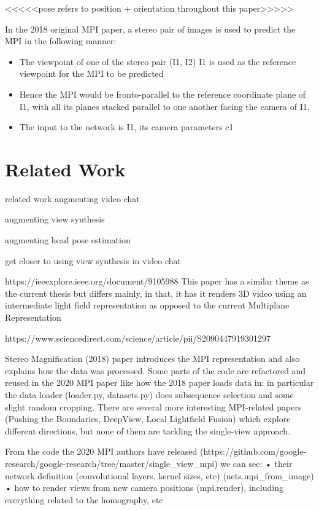 <<<<<pose refers to position + orientation throughout this paper>>>>>

In the 2018 original MPI paper, a stereo pair of images is used to predict the MPI in the following manner:

\begin{itemize}
    \item The viewpoint of one of the stereo pair (I1, I2) I1 is used as the reference viewpoint for the MPI to be predicted
    \item Hence the MPI would be fronto-parallel to the reference coordinate plane of I1, with all its planes stacked parallel to one another facing the camera of I1.
    \item The input to the network is I1, its camera parameters c1
\end{itemize}

\chapter{Related Work}\label{ch2:related-work}
related work augmenting video chat 

augmenting view synthesis


augmenting head pose estimation

get closer to using view synthesis in video chat 

https://ieeexplore.ieee.org/document/9105988
This paper has a similar theme as the current thesis but differs mainly, in that, it has it renders 3D video using an intermediate light field representation as opposed to the current Multiplane Representation

https://www.sciencedirect.com/science/article/pii/S2090447919301297




Stereo Magnification (2018) paper introduces the MPI representation and also explains how the data was processed. Some parts of the code are refactored and reused in the 2020 MPI paper like how the 2018 paper loads data in: in particular the data loader (loader.py, datasets.py) does subsequence selection and some slight random cropping. There are several more interesting MPI-related papers (Pushing the Boundaries, DeepView, Local Lightfield Fusion) which explore different directions, but none of them are tackling the single-view approach.

From the code the 2020 MPI authors have released (https://github.com/google-research/google-research/tree/master/single_view_mpi) we can see:
  • their network definition (convolutional layers, kernel sizes, etc) (nets.mpi_from_image)
  • how to render views from new camera positions (mpi.render), including everything related to the homography, etc

